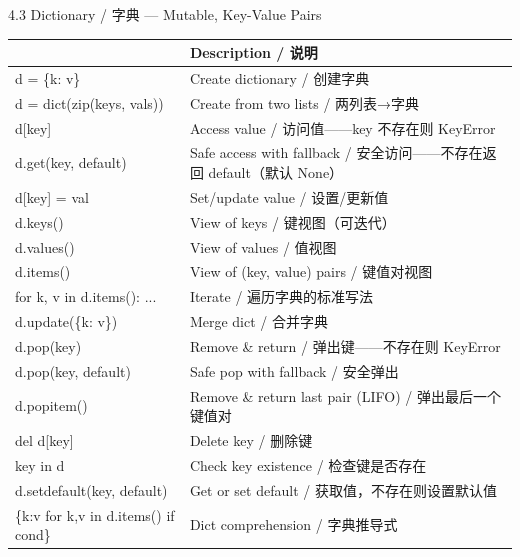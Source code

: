 \documentclass[11pt,a4paper]{report}
\begin{document}
\begin{cmdsection}{4.3  Dictionary / 字典 — Mutable, Key-Value Pairs}
\normalsize\renewcommand{\arraystretch}{1.4}
\centering
\begin{tabularx}{\textwidth}{@{}>{\ttfamily}l>{\raggedright\arraybackslash}X@{}}
\toprule
\multicolumn{1}{@{}l}{\textbf{Syntax}} & \textbf{Description / 说明} \\ \midrule
d = \{k: v\}                 & Create dictionary / 创建字典 \\
d = dict(zip(keys, vals))   & Create from two lists / 两列表→字典 \\
d[key]                      & Access value / 访问值——key 不存在则 KeyError \\
d.get(key, default)         & Safe access with fallback / 安全访问——不存在返回 default（默认 None） \\
d[key] = val                & Set/update value / 设置/更新值 \\
d.keys()                    & View of keys / 键视图（可迭代） \\
d.values()                  & View of values / 值视图 \\
d.items()                   & View of (key, value) pairs / 键值对视图 \\
for k, v in d.items(): ...  & Iterate / 遍历字典的标准写法 \\
d.update(\{k: v\})           & Merge dict / 合并字典 \\
d.pop(key)                  & Remove \& return / 弹出键——不存在则 KeyError \\
d.pop(key, default)         & Safe pop with fallback / 安全弹出 \\
d.popitem()                 & Remove \& return last pair (LIFO) / 弹出最后一个键值对 \\
del d[key]                  & Delete key / 删除键 \\
key in d                    & Check key existence / 检查键是否存在 \\
d.setdefault(key, default)  & Get or set default / 获取值，不存在则设置默认值 \\
\{k:v for k,v in d.items() if cond\} & Dict comprehension / 字典推导式 \\
\bottomrule
\end{tabularx}
\end{cmdsection}
\end{document}
